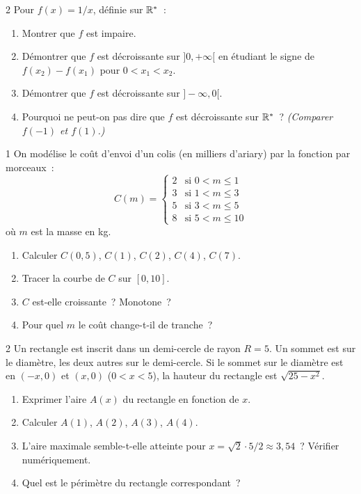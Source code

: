 \begin{probleme}[\'Etude de $f(x)=1/x$ \corrigeP]{2}
Pour $f(x)=1/x$, d\'efinie sur $\mathbb{R}^*$~:
\begin{enumerate}
  \item Montrer que $f$ est impaire.
  \item D\'emontrer que $f$ est d\'ecroissante sur $]0,+\infty[$
        en \'etudiant le signe de $f(x_2)-f(x_1)$ pour $0<x_1<x_2$.
  \item D\'emontrer que $f$ est d\'ecroissante sur $]-\infty,0[$.
  \item Pourquoi ne peut-on pas dire que $f$ est \og d\'ecroissante sur $\mathbb{R}^*$\fg~?
        \emph{(Comparer $f(-1)$ et $f(1)$.)}
\end{enumerate}
\end{probleme}

\begin{probleme}{1}
On mod\'elise le co\^ut d'envoi d'un colis (en milliers d'ariary)
par la fonction par morceaux~:
$$C(m) = \begin{cases}2 & \text{si }0<m\leq1 \\ 3 & \text{si }1<m\leq3 \\
5 & \text{si }3<m\leq5 \\ 8 & \text{si }5<m\leq10\end{cases}$$
o\`u $m$ est la masse en kg.
\begin{enumerate}
  \item Calculer $C(0{,}5)$, $C(1)$, $C(2)$, $C(4)$, $C(7)$.
  \item Tracer la courbe de $C$ sur $[0,10]$.
  \item $C$ est-elle croissante~? Monotone~?
  \item Pour quel $m$ le co\^ut change-t-il de tranche~?
\end{enumerate}
\end{probleme}

\begin{probleme}{2}
Un rectangle est inscrit dans un demi-cercle de rayon $R=5$.
Un sommet est sur le diam\`etre, les deux autres sur le demi-cercle.
Si le sommet sur le diam\`etre est en $(-x,0)$ et $(x,0)$
($0<x<5$), la hauteur du rectangle est $\sqrt{25-x^2}$.
\begin{enumerate}
  \item Exprimer l'aire $A(x)$ du rectangle en fonction de $x$.
  \item Calculer $A(1)$, $A(2)$, $A(3)$, $A(4)$.
  \item L'aire maximale semble-t-elle atteinte pour $x=\sqrt{2}\cdot5/2\approx3{,}54$~?
        V\'erifier num\'eriquement.
  \item Quel est le p\'erim\`etre du rectangle correspondant~?
\end{enumerate}
\end{probleme}

